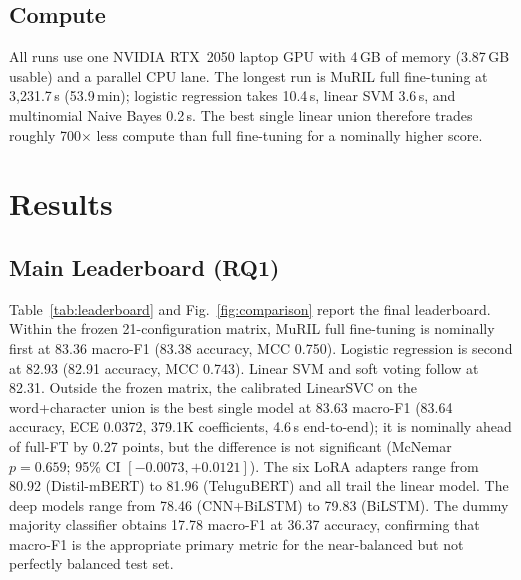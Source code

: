 \documentclass[10pt,journal]{IEEEtran}
\begin{document}
\subsection{Compute}
All runs use one NVIDIA RTX~2050 laptop GPU with 4\,GB of memory (3.87\,GB usable) and a parallel CPU lane. The longest run is MuRIL full fine-tuning at 3{,}231.7\,s (53.9\,min); logistic regression takes 10.4\,s, linear SVM 3.6\,s, and multinomial Naive Bayes 0.2\,s. The best single linear union therefore trades roughly 700$\times$ less compute than full fine-tuning for a nominally higher score.

\section{Results}
\subsection{Main Leaderboard (RQ1)}
Table~\ref{tab:leaderboard} and Fig.~\ref{fig:comparison} report the final leaderboard. Within the frozen 21-configuration matrix, MuRIL full fine-tuning is nominally first at 83.36 macro-F1 (83.38 accuracy, MCC 0.750). Logistic regression is second at 82.93 (82.91 accuracy, MCC 0.743). Linear SVM and soft voting follow at 82.31. Outside the frozen matrix, the calibrated LinearSVC on the word+character union is the best single model at 83.63 macro-F1 (83.64 accuracy, ECE 0.0372, 379.1K coefficients, 4.6\,s end-to-end); it is nominally ahead of full-FT by 0.27 points, but the difference is not significant (McNemar $p=0.659$; 95\% CI $[-0.0073,+0.0121]$). The six LoRA adapters range from 80.92 (Distil-mBERT) to 81.96 (TeluguBERT) and all trail the linear model. The deep models range from 78.46 (CNN+BiLSTM) to 79.83 (BiLSTM). The dummy majority classifier obtains 17.78 macro-F1 at 36.37 accuracy, confirming that macro-F1 is the appropriate primary metric for the near-balanced but not perfectly balanced test set.
\end{document}
